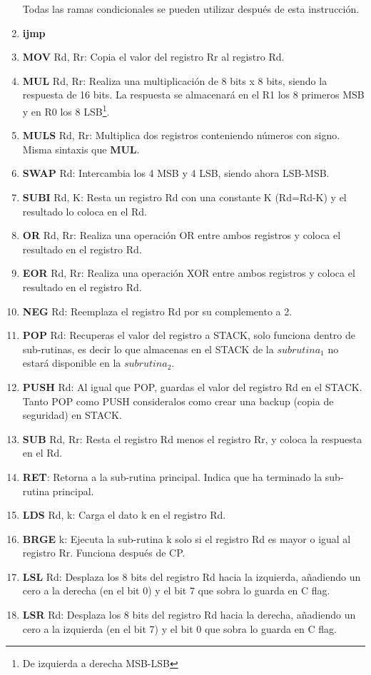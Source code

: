 \documentclass[
	12pt, %
	fleqn, %
	a4paper, %
	oneside, %
]{LegrandOrangeBook}
\begin{document}
\begin{enumerate}
Todas las ramas condicionales se pueden utilizar después de esta instrucción.
\item \textbf{ijmp}
\item \textbf{MOV} Rd, Rr: Copia el valor del registro Rr al registro Rd.
\item \textbf{MUL} Rd, Rr: Realiza una multiplicación de 8 bits x 8 bits, siendo la respuesta de 16 bits. La respuesta se almacenará en el R1 los 8 primeros MSB y en R0 los 8 LSB\footnote{De izquierda a derecha MSB-LSB}.
\item \textbf{MULS} Rd, Rr: Multiplica dos registros conteniendo números con signo. Misma sintaxis que \textbf{MUL}.
\item \textbf{SWAP} Rd: Intercambia los 4 MSB y 4 LSB, siendo ahora LSB-MSB.
\item \textbf{SUBI} Rd, K: Resta un registro Rd con una constante K (Rd=Rd-K) y el resultado lo coloca en el Rd.
\item \textbf{OR} Rd, Rr: Realiza una operación OR entre ambos registros y coloca el resultado en el registro Rd.
\item \textbf{EOR} Rd, Rr: Realiza una operación XOR entre ambos registros y coloca el resultado en el registro Rd.
\item \textbf{NEG} Rd: Reemplaza el registro Rd por su complemento a 2.
\item \textbf{POP} Rd: Recuperas el valor del registro a STACK, solo funciona dentro de sub-rutinas, es decir lo que almacenas en el STACK de la $subrutina_1$ no estará disponible en la $subrutina_2$.
\item \textbf{PUSH} Rd: Al igual que POP, guardas el valor del registro Rd en el STACK. Tanto POP como PUSH consideralos como crear una backup (copia de seguridad) en STACK.
\item \textbf{SUB} Rd, Rr: Resta el registro Rd menos el registro Rr, y coloca la respuesta en el Rd.
\item \textbf{RET}: Retorna a la sub-rutina principal. Indica que ha terminado la sub-rutina principal.
\item \textbf{LDS} Rd, k: Carga el dato k en el registro Rd.
\item \textbf{BRGE} k: Ejecuta la sub-rutina k solo si el registro Rd es mayor o igual al registro Rr. Funciona después de CP.
\item \textbf{LSL} Rd: Desplaza los 8 bits del registro Rd hacia la izquierda, añadiendo un cero a la derecha (en el bit 0) y el bit 7 que sobra lo guarda en C flag.
\item \textbf{LSR} Rd: Desplaza los 8 bits del registro Rd hacia la derecha, añadiendo un cero a la izquierda (en el bit 7) y el bit 0 que sobra lo guarda en C flag.

\end{enumerate}
\end{document}
